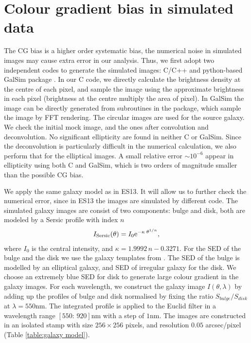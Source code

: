 \documentclass[useAMS,usenatbib]{mn2e}
\newcommand{\be}{\begin{equation}}
\newcommand{\ee}{\end{equation}}
\begin{document}
\section{Colour gradient bias in simulated data}

The CG bias is a higher order systematic bias, the numerical noise in
simulated images may cause extra error in our analysis. Thus, we first
adopt two independent codes to generate the simulated images: C/C++
and python-based GalSim package
\citep{2015A&amp;C....10..121R}. In our C code, we directly calculate
the brightness density at the centre of each pixel, and sample the
image using the approximate brightness in each pixel (brightness at
the centre multiply the area of pixel). In GalSim the image can be
directly generated from subroutines in the package, which sample the
image by FFT rendering.
%
The circular images are used for the source galaxy. We check the
initial mock image, and the ones after convolution and
deconvolution. No significant ellipticity are found in neither C or
GalSim.  Since the deconvolution is particularly difficult in the
numerical calculation, we also perform that for the elliptical
images. A small relative error $\sim10^{-6}$ appear in ellipticity
using both C and GalSim, which is two orders of magnitude smaller than
the possible CG bias.

We apply the same galaxy model as in ES13. It will allow us to further
check the numerical error, since in ES13 the images are simulated by
different code. The simulated galaxy images are consist of two
components: bulge and disk, both are modeled by a Sersic profile with index $n$
%
\be
I_{\rm Sersic}(\theta) = I_0 {\rm e}^{-\kappa\; \theta^{1/n}},
\ee
%
where $I_0$ is the central intensity, and $\kappa=1.9992\,n -
0.3271$.  For the SED of the bulge and the disk we use the galaxy
templates from \citet{1980ApJS...43..393C}. The SED of the bulge is
modelled by an elliptical galaxy, and SED of irregular galaxy for the
disk. We choose an extremely blue SED for disk to generate large
colour gradient in the galaxy images. For each wavelength, we
construct the galaxy image $I(\theta,\lambda)$ by adding up the
profiles of bulge and disk normalised by fixing the ratio
$S_{bulge}/S_{disk}$ at $\lambda=550$nm. The integrated profile is
applied to the Euclid filter in a wavelength range $[550:\,920]$nm
with a step of $1$nm. The images are constructed in an isolated stamp
with size $256\times256$ pixels, and resolution $0.05$ arcsec/pixel
(Table \ref{table:galaxy model}).
\end{document}
